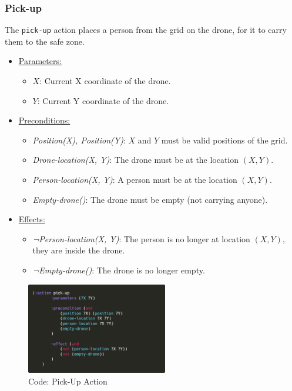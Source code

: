 \documentclass{article}
\begin{document}
\subsubsection{Pick-up}
The \texttt{pick-up} action places a person from the grid on the drone, for it to carry them to the safe zone.
\begin{itemize}
    \item \underline{Parameters:}
    \begin{itemize}
        \item $X$: Current X coordinate of the drone.
        \item $Y$: Current Y coordinate of the drone.
    \end{itemize}
    \item \underline{Preconditions:}
    \begin{itemize}
        \item \textit{Position(X), Position(Y)}: $X$ and $Y$ must be valid positions of the grid.
        \item \textit{Drone-location(X, Y)}: The drone must be at the location $(X, Y)$.
        \item \textit{Person-location(X, Y)}: A person must be at the location $(X, Y)$.
        \item \textit{Empty-drone()}: The drone must be empty (not carrying anyone).
    \end{itemize}
    \item \underline{Effects:}
    \begin{itemize}
        \item \textit{¬Person-location(X, Y)}: The person is no longer at location $(X, Y)$, they are inside the drone.
        \item \textit{¬Empty-drone()}: The drone is no longer empty.
    \end{itemize}
\end{itemize}
\begin{figure}[ht]
    \centering
    \includegraphics[width=0.55\textwidth]{assets/solution_coordinates/pick-up.png}
    \caption{Code: Pick-Up Action}
    \label{fig:act:pick-up}
\end{figure}
\end{document}
